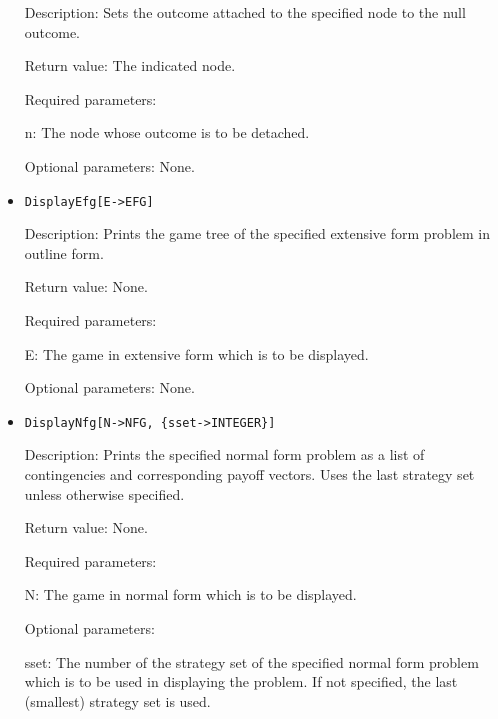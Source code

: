 \begin{itemize}
\bd
\item
[Description:] Sets the outcome attached to the specified node to the
null outcome.
\item   
[Return value:] The indicated node.
\item
[Required parameters:]\hfil\null

\bd
\item	
[n:] The node whose outcome is to be detached.
\ed

\item
[Optional parameters:] None.
\ed

\item
\protect \large \begin{verbatim}
DisplayEfg[E->EFG]
\end{verbatim}\normalsize

\bd
\item
[Description:] Prints the game tree of the specified extensive form
problem in outline form.
\item
[Return value:] None.
\item
[Required parameters:]\hfil\null

\bd
\item
[E:] The game in extensive form which is to be displayed.
\ed

\item
[Optional parameters:] None.
\ed

\item
\protect \large \begin{verbatim}
DisplayNfg[N->NFG, {sset->INTEGER}]
\end{verbatim}\normalsize

\bd
\item
[Description:] Prints the specified normal form problem as a list of
contingencies and corresponding payoff vectors.  Uses the last
strategy set unless otherwise specified.
\item
[Return value:] None.
\item
[Required parameters:]\hfil\null

\bd	
\item
[N:] The game in normal form which is to be displayed.
\ed

\item
[Optional parameters:]\hfil\null

\bd
\item
[sset:] The number of the strategy set of the specified normal form
problem which is to be used in displaying the problem.  If not
specified, the last (smallest) strategy set is used.
\ed
\ed


\end{itemize}
